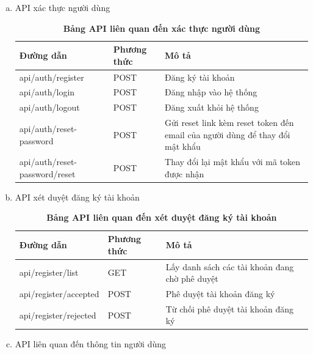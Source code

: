 \begin{enumerate}[a)]
  \item API xác thực người dùng

  \begin{xltabular}{\textwidth}{
    | >{\raggedright\arraybackslash}p{4.5cm}
    | >{\centering\arraybackslash}m{2.8cm}
    | >{\raggedright\arraybackslash}X |
    }
    \caption{\bfseries \fontsize{12pt}{0pt}\selectfont Bảng API liên quan đến xác thực người dùng}
    \label{table_api_auth}
    \\
    \hline
    \bfseries Đường dẫn    &\bfseries Phương thức    &\bfseries Mô tả\\ \hline
    api/auth/register   &   POST  & Đăng ký tài khoản \\ \hline
  api/auth/login   &    POST    & Đăng nhập vào hệ thống \\ \hline
  api/auth/logout   &    POST    & Đăng xuất khỏi hệ thống \\ \hline
  api/auth/reset-password  &     POST   &  Gửi reset link kèm reset token đến email của người dùng để thay đổi mật khẩu \\  \hline
  api/auth/reset-password/reset &   POST     &  Thay đổi lại mật khẩu với mã token được nhận  \\ \hline
  \end{xltabular}

  \item API xét duyệt đăng ký tài khoản

  \begin{xltabular}{\textwidth}{
    | >{\raggedright\arraybackslash}p{4cm}
    | >{\centering\arraybackslash}m{2.8cm}
    | >{\raggedright\arraybackslash}X |
    }
    \caption{\bfseries \fontsize{12pt}{0pt}\selectfont Bảng API liên quan đến xét duyệt đăng ký tài khoản}
    \label{table_api_register}
    \\
    \hline
    \bfseries Đường dẫn    &\bfseries Phương thức    &\bfseries Mô tả\\ \hline
    api/register/list   &   GET  & Lấy danh sách các tài khoản đang chờ phê duyệt \\ \hline
    api/register/accepted   &    POST    & Phê duyệt tài khoản đăng ký \\ \hline
    api/register/rejected  &     POST   &  Từ chối phê duyệt tài khoản đăng ký \\  \hline  
  \end{xltabular}

  \item API liên quan đến thông tin người dùng
  

\end{enumerate}
